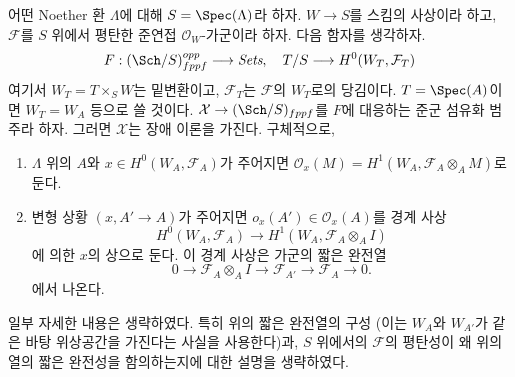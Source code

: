 \begin{example}
\label{example-global-sections}
어떤 Noether 환 $\Lambda$에 대해 $S = \Spec(\Lambda)$라 하자.
$W \to S$를 스킴의 사상이라 하고,
$\mathcal{F}$를 $S$ 위에서 평탄한 준연접 $\mathcal{O}_W$-가군이라 하자.
다음 함자를 생각하자.
$$
F : (\Sch/S)_{fppf}^{opp} \longrightarrow \textit{Sets},
\quad
T/S \longrightarrow H^0(W_T, \mathcal{F}_T)
$$
여기서 $W_T = T \times_S W$는 밑변환이고, $\mathcal{F}_T$는
$\mathcal{F}$의 $W_T$로의 당김이다. $T = \Spec(A)$이면
$W_T = W_A$ 등으로 쓸 것이다.
$\mathcal{X} \to (\Sch/S)_{fppf}$를 $F$에 대응하는 준군 섬유화 범주라
하자. 그러면 $\mathcal{X}$는 장애 이론을 가진다. 구체적으로,
\begin{enumerate}
\item $\Lambda$ 위의 $A$와 $x \in H^0(W_A, \mathcal{F}_A)$가 주어지면
$\mathcal{O}_x(M) = H^1(W_A, \mathcal{F}_A \otimes_A M)$로 둔다.
\item 변형 상황 $(x, A' \to A)$가 주어지면
$o_x(A') \in \mathcal{O}_x(A)$를 경계 사상
$$
H^0(W_A, \mathcal{F}_A) \longrightarrow H^1(W_A, \mathcal{F}_A \otimes_A I)
$$
에 의한 $x$의 상으로 둔다. 이 경계 사상은 가군의 짧은 완전열
$$
0 \to \mathcal{F}_A \otimes_A I \to
\mathcal{F}_{A'} \to \mathcal{F}_A \to 0.
$$
에서 나온다.
\end{enumerate}
일부 자세한 내용은 생략하였다. 특히 위의 짧은 완전열의 구성
(이는 $W_A$와 $W_{A'}$가 같은 바탕 위상공간을 가진다는 사실을 사용한다)과,
$S$ 위에서의 $\mathcal{F}$의 평탄성이 왜 위의 열의 짧은 완전성을
함의하는지에 대한 설명을 생략하였다.
\end{example}

